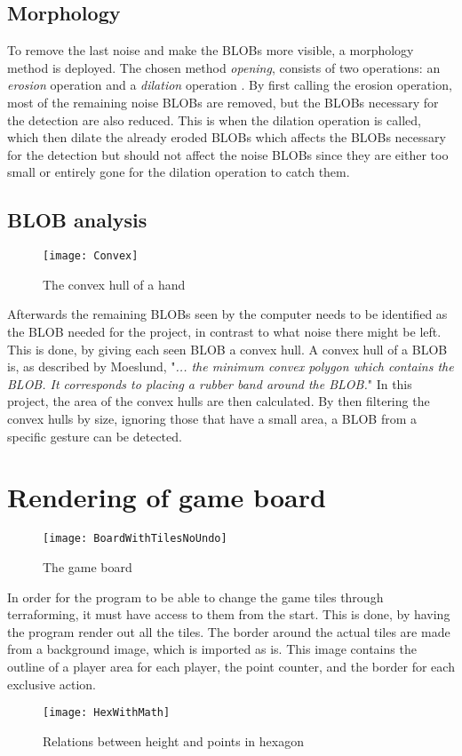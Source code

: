 \subsection{Morphology}
To remove the last noise and make the BLOBs more visible, a morphology method is deployed. The chosen method \textit{opening}, consists of two operations: an \textit{erosion} operation and a \textit{dilation} operation \citep{moeslund_introduction_2012}. By first calling the erosion operation, most of the remaining noise BLOBs are removed, but the BLOBs necessary for the detection are also reduced. This is when the dilation operation is called, which then dilate the already eroded BLOBs which affects the BLOBs necessary for the detection but should not affect the noise BLOBs since they are either too small or entirely gone for the dilation operation to catch them.
 
\subsection{BLOB analysis}
\begin{wrapfigure}{r}{0.32\textwidth}
\begin{center}
\texttt{[image: Convex]}
\end{center}
\caption{The convex hull of a hand \label{Fig:Convex}}
\end{wrapfigure}
Afterwards the remaining BLOBs seen by the computer needs to be identified as the BLOB needed for the project, in contrast to what noise there might be left. This is done, by giving each seen BLOB a convex hull. A convex hull of a BLOB is, as described by Moeslund, "\textit{... the minimum convex polygon which contains the BLOB. It corresponds to placing a rubber band around the BLOB.}" \citep{moeslund_introduction_2012} In this project, the area of the convex hulls are then calculated. By then filtering the convex hulls by size, ignoring those that have a small area, a BLOB from a specific gesture can be detected.

\section{Rendering of game board}
\begin{figure}[h!]
\centering \texttt{[image: BoardWithTilesNoUndo]}
\caption{The game board \label{Fig:Board}}
\end{figure}
In order for the program to be able to change the game tiles through terraforming, it must have access to them from the start. This is done, by having the program render out all the tiles. The border around the actual tiles are made from a background image, which is imported as is. This image contains the outline of a player area for each player, the point counter, and the border for each exclusive action. 
\begin{figure}[h!]
\centering \texttt{[image: HexWithMath]}
\caption{Relations between height and points in hexagon \label{Fig:HexWithMath}}
\end{figure}

